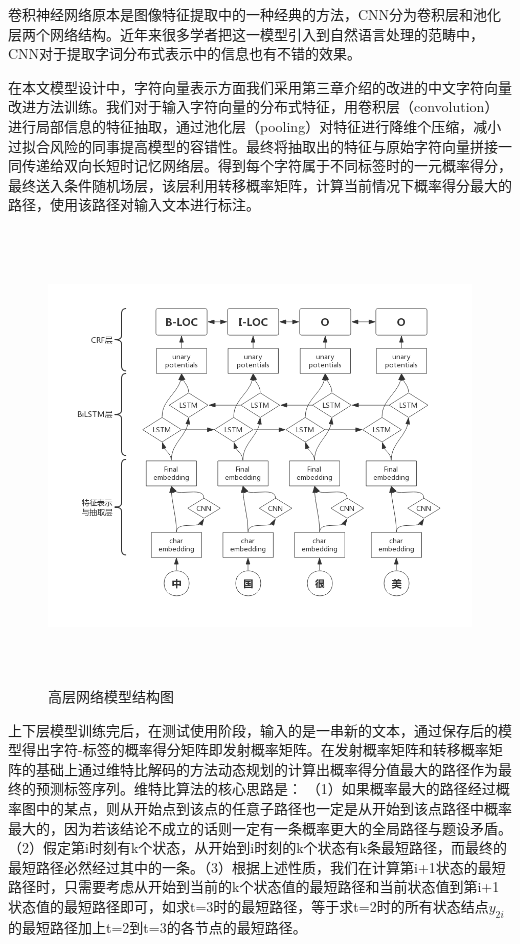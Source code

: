 \documentclass[winfonts,master,oneside,nobackinfo]{njuthesis}
\begin{document}
卷积神经网络原本是图像特征提取中的一种经典的方法，CNN分为卷积层和池化层两个网络结构。近年来很多学者把这一模型引入到自然语言处理的范畴中，CNN对于提取字词分布式表示中的信息也有不错的效果。

在本文模型设计中，字符向量表示方面我们采用第三章介绍的改进的中文字符向量改进方法训练。我们对于输入字符向量的分布式特征，用卷积层（convolution）进行局部信息的特征抽取，通过池化层（pooling）对特征进行降维个压缩，减小过拟合风险的同事提高模型的容错性。最终将抽取出的特征与原始字符向量拼接一同传递给双向长短时记忆网络层。得到每个字符属于不同标签时的一元概率得分，最终送入条件随机场层，该层利用转移概率矩阵，计算当前情况下概率得分最大的路径，使用该路径对输入文本进行标注。



\begin{figure}[H]
\centering
\begin{minipage}[t]{\textwidth}
\includegraphics[width=1\textwidth,height=12cm]{./figure/CNN辅助.jpg}
\caption{高层网络模型结构图}
\label{lab:1}
\end{minipage}
\end{figure}

上下层模型训练完后，在测试使用阶段，输入的是一串新的文本，通过保存后的模型得出字符-标签的概率得分矩阵即发射概率矩阵。在发射概率矩阵和转移概率矩阵的基础上通过维特比解码的方法动态规划的计算出概率得分值最大的路径作为最终的预测标签序列。维特比算法的核心思路是： （1）如果概率最大的路径经过概率图中的某点，则从开始点到该点的任意子路径也一定是从开始到该点路径中概率最大的，因为若该结论不成立的话则一定有一条概率更大的全局路径与题设矛盾。（2）假定第i时刻有k个状态，从开始到i时刻的k个状态有k条最短路径，而最终的最短路径必然经过其中的一条。（3）根据上述性质，我们在计算第i+1状态的最短路径时，只需要考虑从开始到当前的k个状态值的最短路径和当前状态值到第i+1状态值的最短路径即可，如求t=3时的最短路径，等于求t=2时的所有状态结点$y_{2i}$的最短路径加上t=2到t=3的各节点的最短路径。
\end{document}
